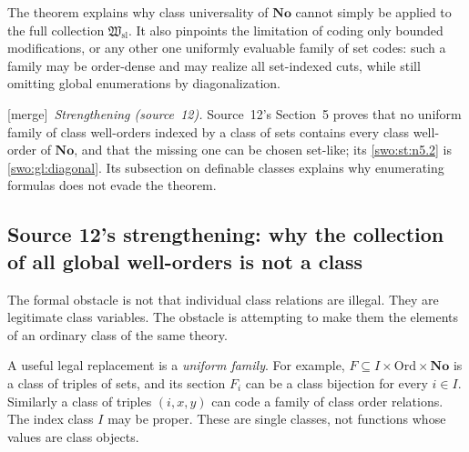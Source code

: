 \documentclass[11pt]{article}
\theoremstyle{definition}
\theoremstyle{remark}
\newcommand{\No}{\mathbf{No}}
\newcommand{\Ord}{\mathrm{Ord}}
\newcommand{\Hsl}{\mathfrak W_{\mathrm{sl}}}
\newcommand{\merge}{\textsf{[merge]}}
\begin{document}
The theorem explains why class universality of $\No$ cannot simply be applied
to the full collection $\Hsl$.  It also pinpoints the limitation of coding
only bounded modifications, or any other one uniformly evaluable family of
set codes: such a family may be order-dense and may realize all set-indexed
cuts, while still omitting global enumerations by diagonalization.


\merge\ \emph{Strengthening (source~12).} Source~12's Section~5 proves that no
uniform family of class well-orders indexed by a class of sets contains every
class well-order of $\No$, and that the missing one can be chosen set-like;
its \cref{swo:st:n5.2} is \cref{swo:gl:diagonal}. Its subsection on definable
classes explains why enumerating formulas does not evade the theorem.

\subsection{Source 12's strengthening: why the collection of all global well-orders is not a class}
\label{swo:st:sec:diagonal}

The formal obstacle is not that individual class relations are illegal.
They are legitimate class variables. The obstacle is attempting to make
them the elements of an ordinary class of the same theory.

A useful legal replacement is a \emph{uniform family}. For example,
$F\subseteq I\times\Ord\times\No$ is a class of triples of sets, and its
section $F_i$ can be a class bijection for every $i\in I$. Similarly a
class of triples $(i,x,y)$ can code a family of class order relations.
The index class $I$ may be proper. These are single classes, not functions
whose values are class objects.
\end{document}
